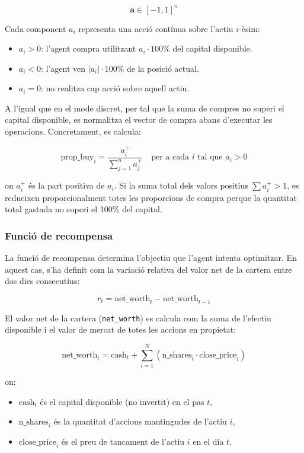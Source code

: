 \documentclass[12pt,a4paper,twoside]{book}
\begin{document}
\[
\mathbf{a} \in [-1, 1]^n
\]

Cada component $a_i$ representa una acció contínua sobre l'actiu $i$-èsim:

\begin{itemize}
    \item $a_i > 0$: l'agent compra utilitzant $a_i \cdot 100\%$ del capital disponible.
    \item $a_i < 0$: l'agent ven $|a_i| \cdot 100\%$ de la posició actual.
    \item $a_i = 0$: no realitza cap acció sobre aquell actiu.
\end{itemize}

A l'igual que en el mode discret, per tal que la suma de compres no superi el capital disponible, es normalitza el vector de compra abans d'executar les operacions. Concretament, es calcula:

\[
\text{prop\_buy}_i = \frac{a_i^+}{\sum_{j=1}^n a_j^+}
\quad \text{per a cada } i \text{ tal que } a_i > 0
\]

on $a_i^+$ és la part positiva de $a_i$. Si la suma total dels valors positius $\sum a_i^+ > 1$, es redueixen proporcionalment totes les proporcions de compra perque la quantitat total gastada no superi el 100\% del capital.


\subsubsection{Funció de recompensa}

La funció de recompensa determina l'objectiu que l'agent intenta optimitzar. En aquest cas, s'ha definit com la variació relativa del valor net de la cartera entre dos dies consecutius:

\begin{equation}
r_t = \text{net\_worth}_t - \text{net\_worth}_{t-1}
\end{equation}

El valor net de la cartera (\texttt{net\_worth}) es calcula com la suma de l'efectiu disponible i el valor de mercat de totes les accions en propietat:

\begin{equation}
\text{net\_worth}_t = \text{cash}_t + \sum_{i=1}^{N} \left( \text{n\_shares}_i \cdot \text{close\_price}_i \right)
\end{equation}

on:
\begin{itemize}
    \item $\text{cash}_t$ és el capital disponible (no invertit) en el pas $t$,
    \item $\text{n\_shares}_i$ és la quantitat d'accions mantingudes de l'actiu $i$,
    \item $\text{close\_price}_i$ és el preu de tancament de l'actiu $i$ en el dia $t$.
\end{itemize}
\end{document}
